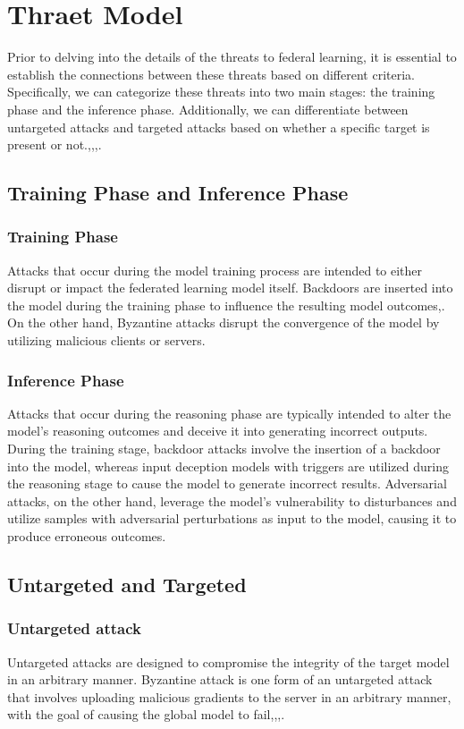 \documentclass[conference]{IEEEtran}
\begin{document}
\section{Thraet Model}
Prior to delving into the details of the threats to federal learning, it is essential
to establish the connections between these threats based on different criteria.
Specifically, we can categorize these threats into two main stages:
the training phase and the inference phase. Additionally, we can
differentiate between untargeted attacks and targeted attacks based
on whether a specific target is present or not.\cite{b38},\cite{b39},\cite{b40},\cite{b41}.

\subsection{Training Phase and Inference Phase}
\subsubsection{Training Phase}Attacks that occur during the model training process are
intended to either disrupt or impact the federated learning model itself. Backdoors are
inserted into the model during the training phase to influence the resulting model outcomes\cite{b45},\cite{b46}.
On the other hand, Byzantine attacks disrupt the convergence of the model by utilizing malicious
clients or servers\cite{b29}.
\subsubsection{Inference Phase}Attacks that occur during the reasoning phase are
typically intended to alter the model's reasoning outcomes and deceive it
into generating incorrect outputs\cite{b47}. During the training stage, backdoor
attacks involve the insertion of a backdoor into the model, whereas
input deception models with triggers are utilized during the
reasoning stage to cause the model to generate incorrect results.
Adversarial attacks, on the other hand, leverage the model's vulnerability
to disturbances and utilize samples with adversarial perturbations as input
to the model, causing it to produce erroneous outcomes.

\subsection{Untargeted and Targeted}
\subsubsection{Untargeted attack}Untargeted attacks are designed to compromise
the integrity of the target model in an arbitrary manner.
Byzantine attack is one form of an untargeted attack that involves
uploading malicious gradients to the server in an arbitrary manner,
with the goal of causing the global model to fail\cite{b48},\cite{b49},\cite{b50},\cite{b51}.
\end{document}
